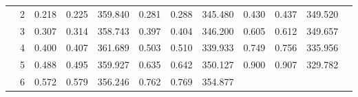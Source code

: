 \begin{table*}
\begin{tabular}{|c|ccc|c|cc|c|cc|c|c|}
\cline{2-11}    \rowcolor[rgb]{ .788,  .788,  .788}       & \multicolumn{1}{c|}{\cellcolor[rgb]{ 1,  1,  1}2} & \multicolumn{1}{c|}{\cellcolor[rgb]{ 1,  1,  1}0.218} & \cellcolor[rgb]{ 1,  1,  1}0.225 & \cellcolor[rgb]{ 1,  1,  1}359.840 & \multicolumn{1}{c|}{\cellcolor[rgb]{ 1,  1,  1}0.281} & \cellcolor[rgb]{ 1,  1,  1}0.288 & \cellcolor[rgb]{ 1,  1,  1}345.480 & \multicolumn{1}{c|}{\cellcolor[rgb]{ 1,  1,  1}0.430} & \cellcolor[rgb]{ 1,  1,  1}0.437 & \cellcolor[rgb]{ 1,  1,  1}349.520 & \multicolumn{1}{c}{\cellcolor[rgb]{ 1,  1,  1}} \bigstrut\\
\cline{2-11}    \rowcolor[rgb]{ .788,  .788,  .788}       & \multicolumn{1}{c|}{\cellcolor[rgb]{ 1,  1,  1}3} & \multicolumn{1}{c|}{\cellcolor[rgb]{ 1,  1,  1}0.307} & \cellcolor[rgb]{ 1,  1,  1}0.314 & \cellcolor[rgb]{ 1,  1,  1}358.743 & \multicolumn{1}{c|}{\cellcolor[rgb]{ 1,  1,  1}0.397} & \cellcolor[rgb]{ 1,  1,  1}0.404 & \cellcolor[rgb]{ 1,  1,  1}346.200 & \multicolumn{1}{c|}{\cellcolor[rgb]{ 1,  1,  1}0.605} & \cellcolor[rgb]{ 1,  1,  1}0.612 & \cellcolor[rgb]{ 1,  1,  1}349.657 & \multicolumn{1}{c}{\cellcolor[rgb]{ 1,  1,  1}} \bigstrut\\
\cline{2-11}    \rowcolor[rgb]{ .788,  .788,  .788}       & \multicolumn{1}{c|}{\cellcolor[rgb]{ 1,  1,  1}4} & \multicolumn{1}{c|}{\cellcolor[rgb]{ 1,  1,  1}0.400} & \cellcolor[rgb]{ 1,  1,  1}0.407 & \cellcolor[rgb]{ 1,  1,  1}361.689 & \multicolumn{1}{c|}{\cellcolor[rgb]{ 1,  1,  1}0.503} & \cellcolor[rgb]{ 1,  1,  1}0.510 & \cellcolor[rgb]{ 1,  1,  1}339.933 & \multicolumn{1}{c|}{\cellcolor[rgb]{ 1,  1,  1}0.749} & \cellcolor[rgb]{ 1,  1,  1}0.756 & \cellcolor[rgb]{ 1,  1,  1}335.956 & \multicolumn{1}{c}{\cellcolor[rgb]{ 1,  1,  1}} \bigstrut\\
\cline{2-11}    \rowcolor[rgb]{ .788,  .788,  .788}       & \multicolumn{1}{c|}{\cellcolor[rgb]{ 1,  1,  1}5} & \multicolumn{1}{c|}{\cellcolor[rgb]{ 1,  1,  1}0.488} & \cellcolor[rgb]{ 1,  1,  1}0.495 & \cellcolor[rgb]{ 1,  1,  1}359.927 & \multicolumn{1}{c|}{\cellcolor[rgb]{ 1,  1,  1}0.635} & \cellcolor[rgb]{ 1,  1,  1}0.642 & \cellcolor[rgb]{ 1,  1,  1}350.127 & \multicolumn{1}{c|}{\cellcolor[rgb]{ 1,  1,  1}0.900} & \cellcolor[rgb]{ 1,  1,  1}0.907 & \cellcolor[rgb]{ 1,  1,  1}329.782 & \multicolumn{1}{c}{\cellcolor[rgb]{ 1,  1,  1}} \bigstrut\\
\cline{2-10}    \rowcolor[rgb]{ .788,  .788,  .788}       & \multicolumn{1}{c|}{\cellcolor[rgb]{ 1,  1,  1}6} & \multicolumn{1}{c|}{\cellcolor[rgb]{ 1,  1,  1}0.572} & \cellcolor[rgb]{ 1,  1,  1}0.579 & \cellcolor[rgb]{ 1,  1,  1}356.246 & \multicolumn{1}{c|}{\cellcolor[rgb]{ 1,  1,  1}0.762} & \cellcolor[rgb]{ 1,  1,  1}0.769 & \cellcolor[rgb]{ 1,  1,  1}354.877 & \multicolumn{2}{c|}{\multirow{6}[11]{*}{\cellcolor[rgb]{ 0,  0,  0}}} & \multicolumn{1}{c}{\multirow{6}[11]{*}{\cellcolor[rgb]{ 0,  0,  0}}} & \multicolumn{1}{c}{\cellcolor[rgb]{ 1,  1,  1}} \bigstrut\\

\end{tabular}
\end{table*}
